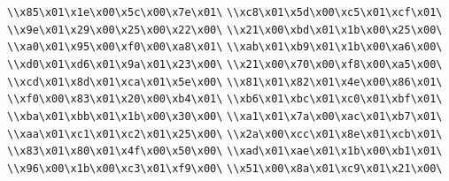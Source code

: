 \verb|\\x85\x01\x1e\x00\x5c\x00\x7e\x01\|\newline
\verb|\\xc8\x01\x5d\x00\xc5\x01\xcf\x01\|\newline
\verb|\\x9e\x01\x29\x00\x25\x00\x22\x00\|\newline
\verb|\\x21\x00\xbd\x01\x1b\x00\x25\x00\|\newline
\verb|\\xa0\x01\x95\x00\xf0\x00\xa8\x01\|\newline
\verb|\\xab\x01\xb9\x01\x1b\x00\xa6\x00\|\newline
\verb|\\xd0\x01\xd6\x01\x9a\x01\x23\x00\|\newline
\verb|\\x21\x00\x70\x00\xf8\x00\xa5\x00\|\newline
\verb|\\xcd\x01\x8d\x01\xca\x01\x5e\x00\|\newline
\verb|\\x81\x01\x82\x01\x4e\x00\x86\x01\|\newline
\verb|\\xf0\x00\x83\x01\x20\x00\xb4\x01\|\newline
\verb|\\xb6\x01\xbc\x01\xc0\x01\xbf\x01\|\newline
\verb|\\xba\x01\xbb\x01\x1b\x00\x30\x00\|\newline
\verb|\\xa1\x01\x7a\x00\xac\x01\xb7\x01\|\newline
\verb|\\xaa\x01\xc1\x01\xc2\x01\x25\x00\|\newline
\verb|\\x2a\x00\xcc\x01\x8e\x01\xcb\x01\|\newline
\verb|\\x83\x01\x80\x01\x4f\x00\x50\x00\|\newline
\verb|\\xad\x01\xae\x01\x1b\x00\xb1\x01\|\newline
\verb|\\x96\x00\x1b\x00\xc3\x01\xf9\x00\|\newline
\verb|\\x51\x00\x8a\x01\xc9\x01\x21\x00\|\newline
